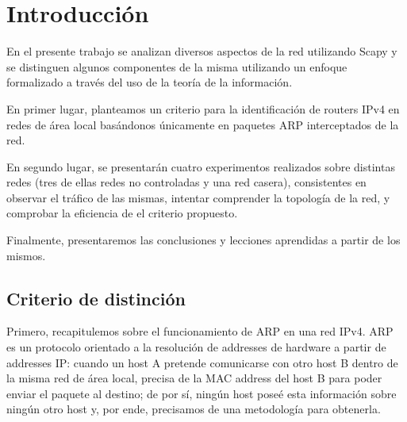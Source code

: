 \documentclass{article}
\theoremstyle{definition}
\theoremstyle{remark}
\begin{document}
\materia{} %

\subtitulo{}
\grupo{}

 
\maketitle

\pagebreak

\tableofcontents

\pagebreak

\section{Introducción}

En el presente trabajo se analizan diversos aspectos de la red utilizando Scapy y se distinguen algunos componentes de la misma utilizando un enfoque formalizado a través del uso de la teoría de la información.

En primer lugar, planteamos un criterio para la identificación de routers IPv4 en redes de área local basándonos únicamente en paquetes ARP interceptados de la red.

En segundo lugar, se presentarán cuatro experimentos realizados sobre distintas redes (tres de ellas redes no controladas y una red casera), consistentes en observar el tráfico de las mismas, intentar comprender la topología de la red, y comprobar la eficiencia de el criterio propuesto.

Finalmente, presentaremos las conclusiones y lecciones aprendidas a partir de los mismos.

\subsection{Criterio de distinción}

Primero, recapitulemos sobre el funcionamiento de ARP en una red IPv4. ARP es un protocolo orientado a la resolución de addresses de hardware a partir de addresses IP: cuando un host A pretende comunicarse con otro host B dentro de la misma red de área local, precisa de la MAC address del host B para poder enviar el paquete al destino; de por sí, ningún host poseé esta información sobre ningún otro host y, por ende, precisamos de una metodología para obtenerla.
\end{document}
